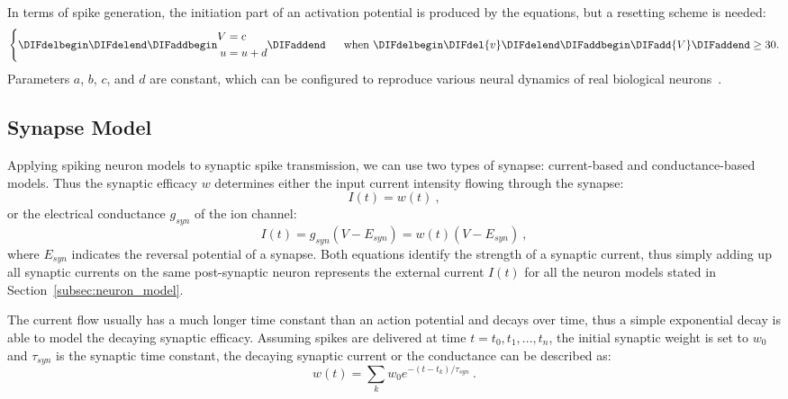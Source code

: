 In terms of spike generation, the initiation part of an activation potential is produced by the equations, but a resetting scheme is needed:
\begin{equation}
\left\{
\DIFdelbegin %
\DIFdelend \DIFaddbegin \begin{aligned}
V &= c \\
u &= u + d
\end{aligned}
\DIFaddend \right.
\textrm{~~~~when~} \DIFdelbegin \DIFdel{v }\DIFdelend \DIFaddbegin \DIFadd{V }\DIFaddend \geq 30.
\end{equation}  
Parameters $a$, $b$, $c$, and $d$ are constant, which can be configured to reproduce various neural dynamics of real biological neurons~\citep{izhikevich2004model}.

\subsection{Synapse Model}
Applying spiking neuron models to synaptic spike transmission, we can use two types of synapse: current-based and conductance-based models.
Thus the synaptic efficacy $w$ determines either the input current intensity flowing through the synapse: %
\begin{equation}
I(t) = w(t)~,
\end{equation}
or the electrical conductance $g_{syn}$ of the ion channel: %
\begin{equation}
I(t) = g_{syn} (V-E_{syn}) = w(t) (V-E_{syn})~,
\end{equation}
where $E_{syn}$ indicates the reversal potential of a synapse.
Both equations identify the strength of a synaptic current, thus simply adding up all synaptic currents on the same post-synaptic neuron represents the external current $I(t)$ for all the neuron models stated in Section~\ref{subsec:neuron_model}.

The current flow usually has a much longer time constant than an action potential and decays over time, thus a simple exponential decay is able to model the decaying synaptic efficacy.
Assuming spikes are delivered at time $t={t_0, t_1, ..., t_n}$, the initial synaptic weight is set to $w_0$ and $\tau_{syn}$ is the synaptic time constant, the decaying synaptic current or the conductance can be described as:
\begin{equation}
w(t) = \sum_k w_0 e^{-(t-t_k)/\tau_{syn}}~.
\end{equation}

